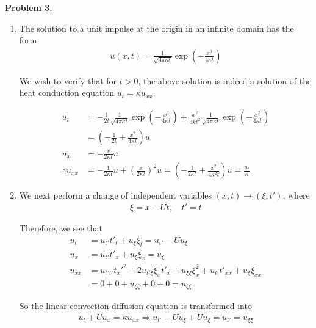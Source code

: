 \textbf{Problem 3.}

\begin{enumerate}[label=(\roman*),leftmargin=*,itemsep=0mm]
    
    \item The solution to a unit impulse at the origin in an infinite domain has the form
    \begin{align*}
        u(x,t) = \frac{1}{\sqrt{4\pi\kappa t}}\exp(-\frac{x^2}{4\kappa t})
    \end{align*}
    
    We wish to verify that for $t>0$, the above solution is indeed a solution of the heat conduction equation $u_t = \kappa u_{xx}$.
    
    \begin{align*}
        u_t &= -\frac{1}{2t}\frac{1}{\sqrt{4\pi\kappa t}} \exp(-\frac{x^2}{4\kappa t})
        + \frac{x^2}{4kt^2}\frac{1}{\sqrt{4\pi\kappa t}} \exp(-\frac{x^2}{4\kappa t}) \\
        &= \left(-\frac{1}{2t}+\frac{x^2}{4\kappa t}\right) u \\
        u_x &= - \frac{x}{2\kappa t} u \\
        \therefore u_{xx}
        &= - \frac{1}{2\kappa t}u + \left(\frac{x}{2\kappa t}\right)^2 u
        = \left(-\frac{1}{2\kappa t}+\frac{x^2}{4\kappa^2 t}\right) u = \frac{u_t}{\kappa}
    \end{align*}
    
    \item We next perform a change of independent variables $(x,t) \rightarrow (\xi,t')$, where
    \begin{align*}
        \xi = x - Ut, \quad t' = t
    \end{align*}
    
    Therefore, we see that
    \begin{align*}
        u_t &= u_{t'}t'_t + u_{\xi}\xi_t
        = u_{t'} - Uu_{\xi} \\
        u_x &= u_{t'}t'_x + u_{\xi}\xi_x = u_\xi \\
        u_{xx} &= u_{t't'} t_x'^2 + 2u_{t'\xi} \xi_x t'_x + u_{\xi\xi}\xi_x^2 + u_{t'}t'_{xx} + u_{\xi}\xi_{xx} \\
        &= 0 + 0 + u_{\xi\xi} + 0 + 0 = u_{\xi\xi}
    \end{align*}
    
    So the linear convection-diffusion equation is transformed into
    \begin{align*}
        u_t + Uu_x = \kappa u_{xx} \Rightarrow u_{t'} - Uu_{\xi} + Uu_{\xi} = u_{t'} = u_{\xi\xi}
    \end{align*}
    

\end{enumerate}
